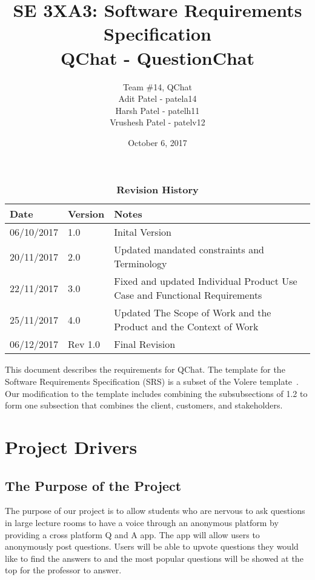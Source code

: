 \documentclass[12pt, titlepage]{article}
\title{SE 3XA3: Software Requirements Specification\\QChat - QuestionChat}
\author{Team \#14, QChat
		\\ Adit Patel - patela14
		\\ Harsh Patel - patelh11
		\\ Vrushesh Patel - patelv12
}
\date{October 6, 2017}
\begin{document}
\maketitle

\tableofcontents
\listoftables

\begin{table}[bp]
\caption{\bf Revision History}
\begin{tabularx}{\textwidth}{p{3cm}p{2cm}X}
\toprule {\bf Date} & {\bf Version} & {\bf Notes}\\
\midrule
06/10/2017 & 1.0 & Inital Version\\
20/11/2017 & 2.0 & Updated mandated constraints and Terminology \\
22/11/2017 & 3.0 & Fixed and updated Individual Product Use Case and Functional Requirements\\
25/11/2017 & 4.0 & Updated The Scope of Work and the Product and the Context of Work\\
06/12/2017 & Rev 1.0 & Final Revision \\
\bottomrule
\end{tabularx}
\end{table}

\newpage


This document describes the requirements for QChat.  The template for the Software
Requirements Specification (SRS) is a subset of the Volere
template~\citep{RobertsonAndRobertson2012}. Our modification to the template includes combining the subsubsections of 1.2 to form one subsection that combines the client, customers, and stakeholders.

\section{Project Drivers}

\subsection{The Purpose of the Project}
The purpose of our project is to allow students who are nervous to ask questions in large lecture rooms to have a voice through an anonymous platform by providing a cross platform Q and A app. The app will allow users to anonymously post questions. Users will be able to upvote questions they would like to find the answers to and the most popular questions will be showed at the top for the professor to answer.
\end{document}
